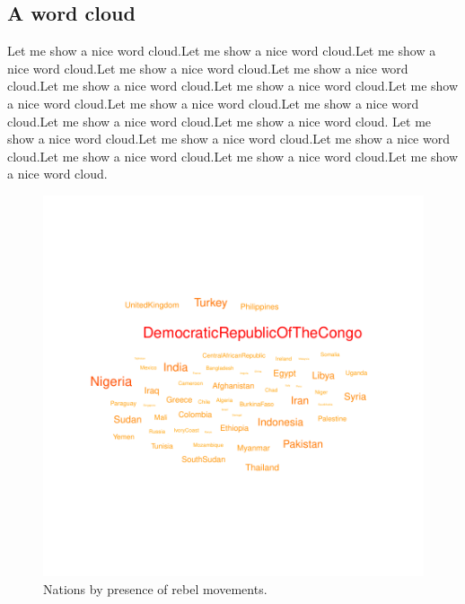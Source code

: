 \documentclass[11pt]{article}
\begin{document}
\subsection{A word cloud}\label{wordPlot}

Let me show a nice word cloud.Let me show a nice word cloud.Let me show a nice word cloud.Let me show a nice word cloud.Let me show a nice word cloud.Let me show a nice word cloud.Let me show a nice word cloud.Let me show a nice word cloud.Let me show a nice word cloud.Let me show a nice word cloud.Let me show a nice word cloud.Let me show a nice word cloud. Let me show a nice word cloud.Let me show a nice word cloud.Let me show a nice word cloud.Let me show a nice word cloud.Let me show a nice word cloud.Let me show a nice word cloud.




\begin{figure}[h]
\centering
\begin{adjustbox}{width=10cm,height=10cm,clip,trim=0cm 2cm 0cm 2cm} 
\includegraphics{WorkInR_forPrinter-cloud_plot}
\end{adjustbox}
\caption{Nations by presence of rebel movements.}  
\label{cloud_plot} 
\end{figure}
\end{document}
